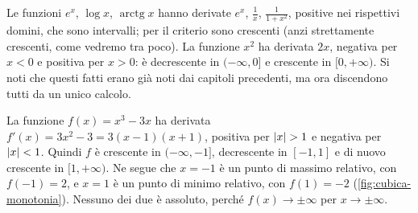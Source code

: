 \begin{esempio}\label{es:monotonia-elementari}
Le funzioni $e^{x}$, $\log x$, $\operatorname{arctg}x$ hanno derivate $e^{x}$,
$\frac1x$, $\frac1{1+x^{2}}$, positive nei rispettivi domini, che sono intervalli; per il
criterio sono crescenti (anzi strettamente crescenti, come vedremo tra poco). La
funzione $x^{2}$ ha derivata $2x$, negativa per $x<0$ e positiva per $x>0$: è
decrescente in $(-\infty,0]$ e crescente in $[0,+\infty)$. Si noti che questi fatti erano
già noti dai capitoli precedenti, ma ora discendono tutti da un unico calcolo.

La funzione $f(x)=x^{3}-3x$ ha derivata $f'(x)=3x^{2}-3=3(x-1)(x+1)$, positiva per
$\lvert x\rvert>1$ e negativa per $\lvert x\rvert<1$. Quindi $f$ è crescente in $(-\infty,-1]$,
decrescente in $[-1,1]$ e di nuovo crescente in $[1,+\infty)$. Ne segue che $x=-1$ è un
punto di massimo relativo, con $f(-1)=2$, e $x=1$ è un punto di minimo relativo, con
$f(1)=-2$ (\cref{fig:cubica-monotonia}). Nessuno dei due è assoluto, perché
$f(x)\to\pm\infty$ per $x\to\pm\infty$.
\end{esempio}

